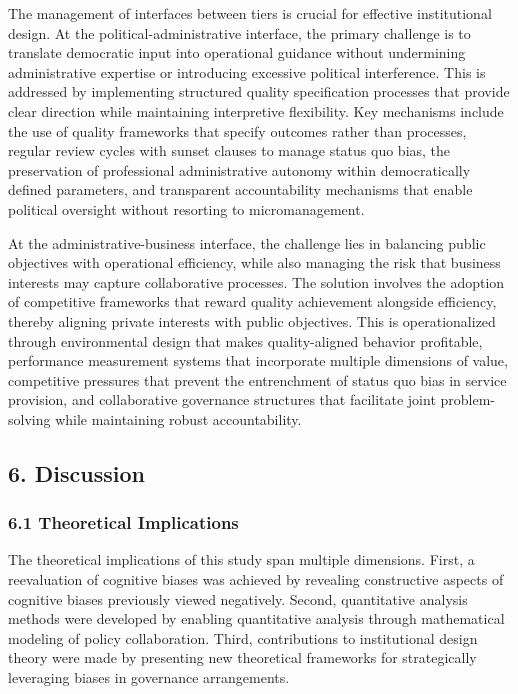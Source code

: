The management of interfaces between tiers is crucial for effective institutional design. At the political-administrative interface, the primary challenge is to translate democratic input into operational guidance without undermining administrative expertise or introducing excessive political interference. This is addressed by implementing structured quality specification processes that provide clear direction while maintaining interpretive flexibility. Key mechanisms include the use of quality frameworks that specify outcomes rather than processes, regular review cycles with sunset clauses to manage status quo bias, the preservation of professional administrative autonomy within democratically defined parameters, and transparent accountability mechanisms that enable political oversight without resorting to micromanagement.

At the administrative-business interface, the challenge lies in balancing public objectives with operational efficiency, while also managing the risk that business interests may capture collaborative processes. The solution involves the adoption of competitive frameworks that reward quality achievement alongside efficiency, thereby aligning private interests with public objectives. This is operationalized through environmental design that makes quality-aligned behavior profitable, performance measurement systems that incorporate multiple dimensions of value, competitive pressures that prevent the entrenchment of status quo bias in service provision, and collaborative governance structures that facilitate joint problem-solving while maintaining robust accountability.

\subsection{6. Discussion}\label{discussion}

\subsubsection{6.1 Theoretical Implications}\label{theoretical-implications}

The theoretical implications of this study span multiple dimensions. First, a reevaluation of cognitive biases was achieved by revealing constructive aspects of cognitive biases previously viewed negatively. Second, quantitative analysis methods were developed by enabling quantitative analysis through mathematical modeling of policy collaboration. Third, contributions to institutional design theory were made by presenting new theoretical frameworks for strategically leveraging biases in governance arrangements.

